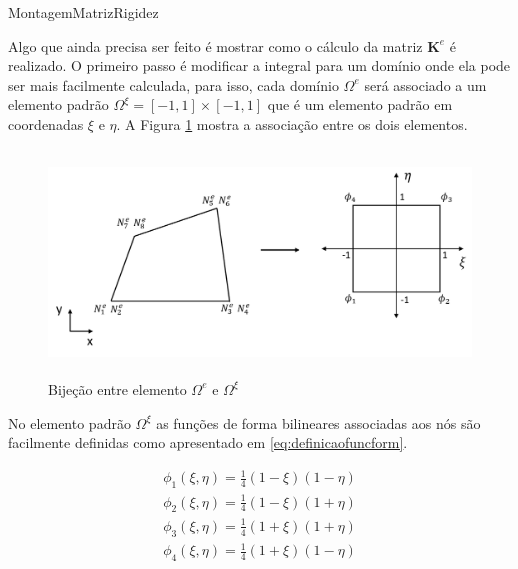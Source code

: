 \vspace{1cm}
\begin{algorithm}[H]
\caption{MontagemMatrizRigidez}
\label{alg:buildmatrix}

\end{algorithm}
\vspace{1cm}



Algo que ainda precisa ser feito é mostrar como o cálculo da matriz $\mathbf{K}^e$ é realizado. O primeiro passo é modificar a integral para um domínio onde ela pode ser mais facilmente calculada, para isso, cada domínio $\Omega^e$ será associado a um elemento padrão  $\Omega^\xi = [-1,1]\times[-1,1]$ que é um elemento padrão em coordenadas $\xi$ e $\eta$. A Figura \ref{fig:bijecaoelemento} mostra a associação entre os dois elementos.


\begin{figure}[!htbp]
\centering
\includegraphics[height=6cm]{chap01/figs/elementopadrao.png}
\caption{Bijeção entre elemento $\Omega^e$ e $\Omega^\xi$}
\label{fig:bijecaoelemento}
\end{figure}


No elemento padrão $\Omega^\xi$ as funções de forma bilineares associadas aos nós são facilmente definidas como apresentado em \eqref{eq:definicaofuncform}.


\begin{equation}
\begin{matrix}\label{eq:definicaofuncform}
\phi_1(\xi, \eta) = \frac{1}{4} (1-\xi)(1-\eta) \\
\phi_2(\xi, \eta) = \frac{1}{4} (1-\xi)(1+\eta) \\
\phi_3(\xi, \eta) = \frac{1}{4} (1+\xi)(1+\eta) \\
\phi_4(\xi, \eta) = \frac{1}{4} (1+\xi)(1-\eta) \\
\end{matrix}
\end{equation}


